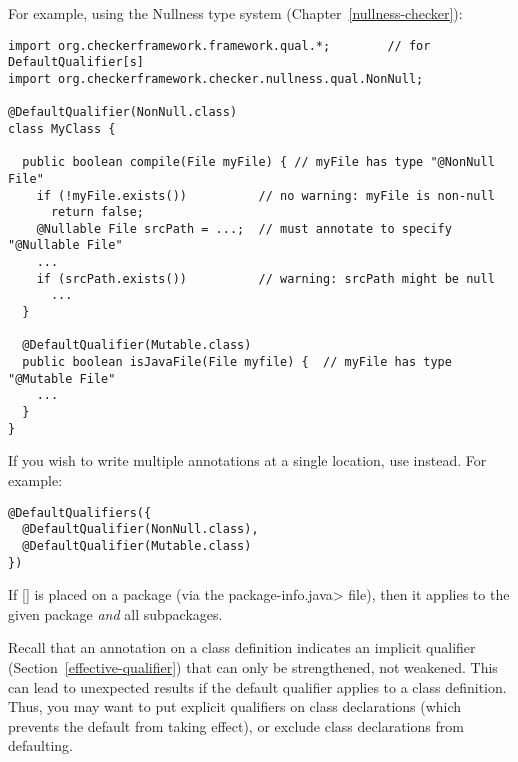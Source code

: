 For example, using the Nullness type system (Chapter~\ref{nullness-checker}):

\begin{Verbatim}
import org.checkerframework.framework.qual.*;        // for DefaultQualifier[s]
import org.checkerframework.checker.nullness.qual.NonNull;

@DefaultQualifier(NonNull.class)
class MyClass {

  public boolean compile(File myFile) { // myFile has type "@NonNull File"
    if (!myFile.exists())          // no warning: myFile is non-null
      return false;
    @Nullable File srcPath = ...;  // must annotate to specify "@Nullable File"
    ...
    if (srcPath.exists())          // warning: srcPath might be null
      ...
  }

  @DefaultQualifier(Mutable.class)
  public boolean isJavaFile(File myfile) {  // myFile has type "@Mutable File"
    ...
  }
}
\end{Verbatim}

If you wish to write multiple
 annotations at a single location,
use
 instead.  For example:

\begin{Verbatim}
@DefaultQualifiers({
  @DefaultQualifier(NonNull.class),
  @DefaultQualifier(Mutable.class)
})
\end{Verbatim}


If [] is placed on a package (via the
\<package-info.java> file), then it applies to the given package \emph{and}
all subpackages.

Recall that an annotation on a class definition indicates an implicit
qualifier (Section~\ref{effective-qualifier}) that can only be
strengthened, not weakened.  This can lead to unexpected results if
the default qualifier applies to a class definition.  Thus, you may want to
put explicit qualifiers on class declarations (which prevents the default
from taking effect), or exclude class declarations from defaulting.




